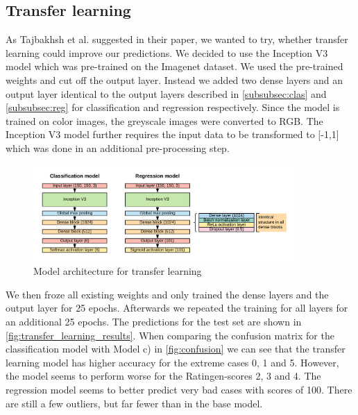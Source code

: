 \documentclass[12pt]{article}
\begin{document}
\subsection{Transfer learning}
\label{subsec:transfer_learning}

As Tajbakhsh et al. \cite{tajbakhsh_2017} suggested in their paper, we wanted to try, whether transfer learning could improve our predictions. We decided to use the Inception V3 model \cite{szegedy_2015} which was pre-trained on the Imagenet dataset. We used the pre-trained weights and cut off the output layer. Instead we added two dense layers and an output layer identical to the output layers described in \autoref{subsubsec:clas} and \autoref{subsubsec:reg} for classification and regression respectively. Since the model is trained on color images, the greyscale images were converted to RGB. The Inception V3 model further requires the input data to be transformed to [-1,1] which was done in an additional pre-processing step.

\begin{figure}[ht]
\includegraphics[width=10cm]{transfer_learning}	
\caption{Model architecture for transfer learning}
\label{fig:transfer_learning}
\end{figure}

We then froze all existing weights and only trained the dense layers and the output layer for 25 epochs. Afterwards we repeated the training for all layers for an additional 25 epochs. The predictions for the test set are shown in \autoref{fig:transfer_learning_results}. When comparing the confusion matrix for the classification model with Model c) in \autoref{fig:confusion} we can see that the transfer learning model has higher accuracy for the extreme cases 0, 1 and 5. However, the model seems to perform worse for the Ratingen-scores 2, 3 and 4. The regression model seems to better predict very bad cases with scores of 100. There are still a few outliers, but far fewer than in the base model.
\end{document}
